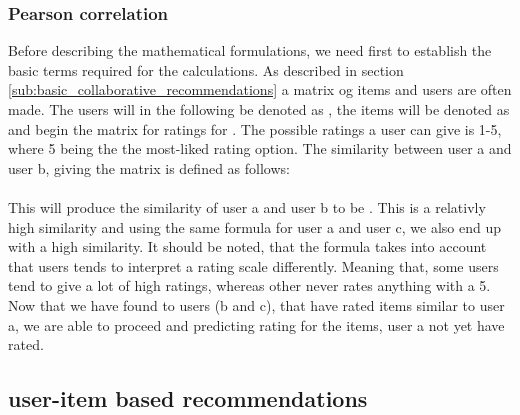 \subsubsection{Pearson correlation}
Before describing the mathematical formulations, we need first to establish the basic terms required for the calculations. As described in section \ref{sub:basic_collaborative_recommendations} a matrix og items and users are often made. The users will in the following be denoted as , the items will be denoted as  and  begin the matrix  for ratings  for . The possible ratings a user can give is 1-5, where 5 being the the most-liked rating option. 
The similarity between user a and user b, giving the matrix  is defined as follows:\\

\\

This will produce the similarity of user a and user b to be . This is a relativly high similarity and using the same formula for user a and user c, we also end up with a high similarity. It should be noted, that the formula takes into account that users tends to interpret a rating scale differently. Meaning that, some users tend to give a lot of high ratings, whereas other never rates anything with a 5. 
Now that we have found to users (b and c), that have rated items similar to user a, we are able to proceed and predicting rating for the items, user a not yet have rated. 


\subsection{user-item based recommendations} %
\label{sub:user_item_based_recommendations}


